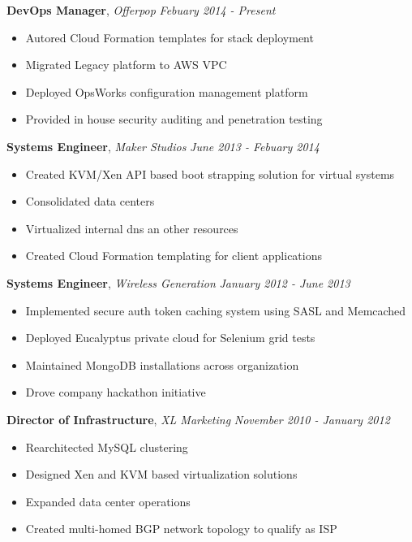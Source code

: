 \documentclass[9pt]{article}
\newenvironment{changemargin}[2]{%
  \begin{list}{}{%
    \setlength{\topsep}{0pt}%
    \setlength{\leftmargin}{#1}%
    \setlength{\rightmargin}{#2}%
    \setlength{\listparindent}{\parindent}%
    \setlength{\itemindent}{\parindent}%
    \setlength{\parsep}{\parskip}%
  }%
  \item[]}{\end{list}
}
\newenvironment{body} {
	\vspace*{-16pt}
	\begin{changemargin}{-0.25in}{-0.5in}
  }
	{\end{changemargin}
}
\begin{document}
\begin{body}
	\vspace{14pt}


	\textbf{DevOps Manager}, \emph{Offerpop} \hfill \emph{Febuary 2014 - Present}\\
	\vspace*{-4pt}
	\begin{itemize} \itemsep -0pt  %
		\item Autored Cloud Formation templates for stack deployment
		\item Migrated Legacy platform to AWS VPC
		\item Deployed OpsWorks configuration management platform
		\item Provided in house security auditing and penetration testing
	\end{itemize}

	\textbf{Systems Engineer}, \emph{Maker Studios} \hfill \emph{June 2013 - Febuary 2014}\\
	\vspace*{-4pt}
	\begin{itemize} \itemsep -0pt  %
		\item Created KVM/Xen API based boot strapping solution for virtual systems
		\item Consolidated data centers
		\item Virtualized internal dns an other resources
		\item Created Cloud Formation templating for client applications
	\end{itemize}

	\textbf{Systems Engineer}, \emph{Wireless Generation} \hfill \emph{January 2012 - June 2013}\\
	\vspace*{-4pt}
	\begin{itemize} \itemsep -0pt  %
		\item Implemented secure auth token caching system using SASL and Memcached
		\item Deployed Eucalyptus private cloud for Selenium grid tests
		\item Maintained MongoDB installations across organization
    \item Drove company hackathon initiative
	\end{itemize}

	\textbf {Director of Infrastructure}, \emph{XL Marketing} \hfill \emph{November 2010 - January 2012}\\
	\vspace*{-4pt}
	\begin{itemize} \itemsep -0pt %
		\item Rearchitected MySQL clustering
		\item Designed Xen and KVM based virtualization solutions
		\item Expanded data center operations
		\item Created multi-homed BGP network topology to qualify as ISP
	\end{itemize}


\end{body}
\end{document}
